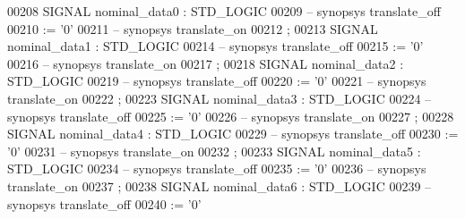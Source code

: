 \begin{DoxyCode}
{00208      \textcolor{keywordflow}{SIGNAL}  \textcolor{vhdlchar}{nominal_data0}  \textcolor{vhdlchar}{:}   \textcolor{comment}{STD\_LOGIC}
00209 \textcolor{keyword}{     -- synopsys translate\_off}
00210       \textcolor{vhdlchar}{:=} \textcolor{vhdlchar}{'}\textcolor{vhdllogic}{}\textcolor{vhdllogic}{0}\textcolor{vhdlchar}{'}
00211 \textcolor{keyword}{     -- synopsys translate\_on}
00212      ;
00213      \textcolor{keywordflow}{SIGNAL}  \textcolor{vhdlchar}{nominal_data1}  \textcolor{vhdlchar}{:}   \textcolor{comment}{STD\_LOGIC}
00214 \textcolor{keyword}{     -- synopsys translate\_off}
00215       \textcolor{vhdlchar}{:=} \textcolor{vhdlchar}{'}\textcolor{vhdllogic}{}\textcolor{vhdllogic}{0}\textcolor{vhdlchar}{'}
00216 \textcolor{keyword}{     -- synopsys translate\_on}
00217      ;
00218      \textcolor{keywordflow}{SIGNAL}  \textcolor{vhdlchar}{nominal_data2}  \textcolor{vhdlchar}{:}   \textcolor{comment}{STD\_LOGIC}
00219 \textcolor{keyword}{     -- synopsys translate\_off}
00220       \textcolor{vhdlchar}{:=} \textcolor{vhdlchar}{'}\textcolor{vhdllogic}{}\textcolor{vhdllogic}{0}\textcolor{vhdlchar}{'}
00221 \textcolor{keyword}{     -- synopsys translate\_on}
00222      ;
00223      \textcolor{keywordflow}{SIGNAL}  \textcolor{vhdlchar}{nominal_data3}  \textcolor{vhdlchar}{:}   \textcolor{comment}{STD\_LOGIC}
00224 \textcolor{keyword}{     -- synopsys translate\_off}
00225       \textcolor{vhdlchar}{:=} \textcolor{vhdlchar}{'}\textcolor{vhdllogic}{}\textcolor{vhdllogic}{0}\textcolor{vhdlchar}{'}
00226 \textcolor{keyword}{     -- synopsys translate\_on}
00227      ;
00228      \textcolor{keywordflow}{SIGNAL}  \textcolor{vhdlchar}{nominal_data4}  \textcolor{vhdlchar}{:}   \textcolor{comment}{STD\_LOGIC}
00229 \textcolor{keyword}{     -- synopsys translate\_off}
00230       \textcolor{vhdlchar}{:=} \textcolor{vhdlchar}{'}\textcolor{vhdllogic}{}\textcolor{vhdllogic}{0}\textcolor{vhdlchar}{'}
00231 \textcolor{keyword}{     -- synopsys translate\_on}
00232      ;
00233      \textcolor{keywordflow}{SIGNAL}  \textcolor{vhdlchar}{nominal_data5}  \textcolor{vhdlchar}{:}   \textcolor{comment}{STD\_LOGIC}
00234 \textcolor{keyword}{     -- synopsys translate\_off}
00235       \textcolor{vhdlchar}{:=} \textcolor{vhdlchar}{'}\textcolor{vhdllogic}{}\textcolor{vhdllogic}{0}\textcolor{vhdlchar}{'}
00236 \textcolor{keyword}{     -- synopsys translate\_on}
00237      ;
00238      \textcolor{keywordflow}{SIGNAL}  \textcolor{vhdlchar}{nominal_data6}  \textcolor{vhdlchar}{:}   \textcolor{comment}{STD\_LOGIC}
00239 \textcolor{keyword}{     -- synopsys translate\_off}
00240       \textcolor{vhdlchar}{:=} \textcolor{vhdlchar}{'}\textcolor{vhdllogic}{}\textcolor{vhdllogic}{0}\textcolor{vhdlchar}{'}
}
\end{DoxyCode}
